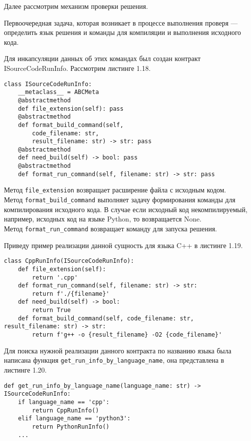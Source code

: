 Далее рассмотрим механизм проверки решения. 

Первоочередная задача, которая возникает в процессе выполнения проверя — определить язык решения и команды для компиляции и выполнения исходного кода.

Для инкапсуляции данных об этих командах был создан контракт ISourceCodeRunInfo. Рассмотрим листинге 1.18.
\begin{lstlisting}[caption={Контракт ISourceCodeRunInfo}]
class ISourceCodeRunInfo:
    __metaclass__ = ABCMeta
    @abstractmethod
    def file_extension(self): pass
    @abstractmethod
    def format_build_command(self, 
        code_filename: str, 
        result_filename: str) -> str: pass
    @abstractmethod
    def need_build(self) -> bool: pass
    @abstractmethod
    def format_run_command(self, filename: str) -> str: pass
\end{lstlisting}

Метод \texttt{file\_extension} возвращает расширение файла с исходным кодом. \\
Метод \texttt{format\_build\_command} выполняет задачу формирования команды для компилирования исходного кода. В случае если исходный код некомпилируемый, например, исходных код на языке Python, то возвращается None.\\
Метод \texttt{format\_run\_command} возвращает команду для запуска решения.

Приведу пример реализации данной сущность для языка C++ в листинге 1.19.

\begin{lstlisting}[caption={Реализация ISourceCodeRunInfo для языка C++}]
class CppRunInfo(ISourceCodeRunInfo):
    def file_extension(self):
        return '.cpp'
    def format_run_command(self, filename: str) -> str:
        return f'./{filename}'
    def need_build(self) -> bool:
        return True
    def format_build_command(self, code_filename: str, result_filename: str) -> str:
        return f'g++ -o {result_filename} -O2 {code_filename}'
\end{lstlisting}

Для поиска нужной реализации данного контракта по названию языка была написана функция \texttt{get\_run\_info\_by\_language\_name}, она представлена в листинге 1.20.
\begin{lstlisting}[caption={Функция поиска по названию языка реализации ISourceCodeRunInfo}]
def get_run_info_by_language_name(language_name: str) -> ISourceCodeRunInfo:
    if language_name == 'cpp':
        return CppRunInfo()
    elif language_name == 'python3':
        return PythonRunInfo()
    ...
\end{lstlisting}

